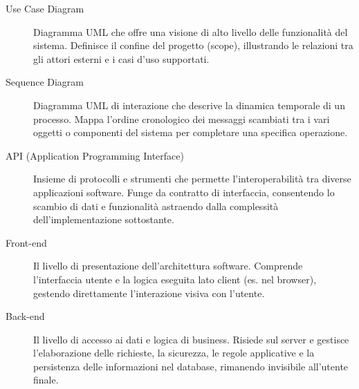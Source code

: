 \begin{description}
    \item[Use Case Diagram] Diagramma UML che offre una visione di alto livello delle funzionalità del sistema. Definisce il confine del progetto (scope), illustrando le relazioni tra gli attori esterni e i casi d'uso supportati.
    \item[Sequence Diagram] Diagramma UML di interazione che descrive la dinamica temporale di un processo. Mappa l'ordine cronologico dei messaggi scambiati tra i vari oggetti o componenti del sistema per completare una specifica operazione.
    \item[API (Application Programming Interface)] Insieme di protocolli e strumenti che permette l'interoperabilità tra diverse applicazioni software. Funge da contratto di interfaccia, consentendo lo scambio di dati e funzionalità astraendo dalla complessità dell'implementazione sottostante.
    \item[Front-end] Il livello di presentazione dell'architettura software. Comprende l'interfaccia utente e la logica eseguita lato client (es. nel browser), gestendo direttamente l'interazione visiva con l'utente.
    \item[Back-end] Il livello di accesso ai dati e logica di business. Risiede sul server e gestisce l'elaborazione delle richieste, la sicurezza, le regole applicative e la persistenza delle informazioni nel database, rimanendo invisibile all'utente finale.
\end{description}

